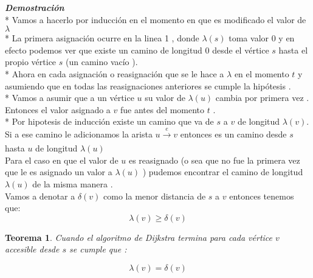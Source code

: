 \documentclass[10pt]{article}
\begin{document}
        \vspace{0.5cm}
        \noindent\textit{\textbf{Demostraci\'on}}
        \\*
        Vamos a hacerlo por inducci\'on en el momento en que es modificado el valor de~$\lambda$
        \\*
        \noindent La primera asignaci\'on ocurre en la linea 1 , donde $\lambda\left(s\right)$ toma valor $0$ 
        y en efecto podemos ver que existe un camino de longitud $0$ desde el v\'ertice $s$ hasta el propio 
        v\'ertice  $s$ (un camino vac\'io ). 
        \\*
        Ahora en cada asignaci\'on o reasignaci\'on que se le hace a $\lambda$ en el momento $t$ 
        y asumiendo que en todas las reasignaciones anteriores se cumple la hip\'otesis  . 
        \\*
        Vamos a asumir que a un v\'ertice $u$ su valor de $\lambda\left(u\right)$ cambia por primera vez . 
        Entonces el valor asignado a $v$ fue antes del momento $t$  . 
        \\*
        Por hipotesis de inducci\'on existe un camino que va de $s$ a $v$ de longitud $\lambda\left(v\right)$. 
        Si a ese camino le adicionamos la arista $u \xrightarrow[]{e} v $ entonces es un camino desde $s$ hasta $u$ 
        de longitud $\lambda\left(u\right)$
        \\[5pt] 
        Para el caso en que el valor de $u$ es reasignado (o sea que no fue la primera vez que le es
        asignado un valor a $\lambda\left(u\right)$ ) pudemos encontrar el camino de longitud
        $\lambda\left(u\right)$ de la misma manera .
        \\[5pt]
        Vamos a denotar a $\delta \left(v\right)$ como la menor distancia de $s$ a $v$ entonces 
        tenemos que: 
        \begin{equation*}
            \lambda\left(v\right) \geq \delta\left(v\right)
        \end{equation*}

        \vspace{1cm} 

        \newtheorem{thm1}{Teorema}
        \begin{thm1}
            \textit{Cuando el algoritmo de Dijkstra termina para cada v\'ertice $v$ accesible desde $s$ se cumple  que : }
        \end{thm1}

        \begin{equation*}
            \lambda\left(v\right) = \delta\left(v\right)
        \end{equation*}
\end{document}
